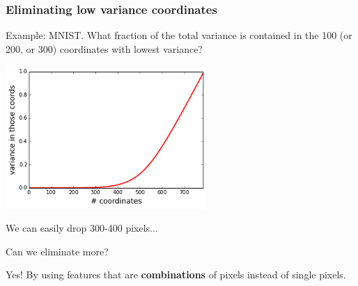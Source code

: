 \documentclass[smaller]{beamer}
\def\E{{\mathbb E}}
\def\darkred{\color{red!70!black}}
\def\v2{{\vskip.2in}}
\def\E{{\mathbb E}}
\begin{document}
\begin{frame}
\frametitle{Eliminating low variance coordinates}

{\darkred Example: MNIST. What fraction of the total variance is contained in the 100 (or 200, or 300) coordinates with lowest variance?}

\pause\v2

\begin{center}
\includegraphics[width=3in]{mnistvar.png}
\end{center}

\pause
We can easily drop 300-400 pixels...

\pause
Can we eliminate more?

\pause
\alert{Yes! By using features that are {\bf combinations} of pixels instead of single pixels.}
\end{frame}

\end{document}
